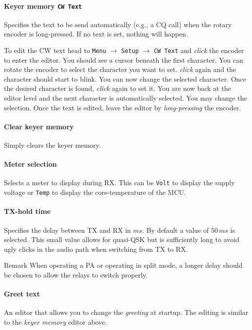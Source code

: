 \documentclass[10pt, a4paper,twoside]{scrartcl}
\newenvironment{remark}{\begin{bclogo}[couleur=blue!30,arrondi=.1,logo=\bcinfo,ombre=true]{Remark}}{\end{bclogo}}
\begin{document}
\paragraph{Keyer memory \texttt{CW Text}}
Specifies the text to be send automatically (e.g., a CQ call) when the rotary encoder is long-pressed. If no text is set, nothing will happen.

To edit the CW text head to \texttt{Menu} $\rightarrow$ \texttt{Setup} $\rightarrow$ \texttt{CW Text} and \emph{click} the encoder to enter the editor. You should see a cursor beneath the first character. You can rotate the encoder to select the character you want to set. \emph{click} again and the character should start to blink. You can now change the selected character. Once the desired character is found, \emph{click} again to set it. You are now back at the editor level and the next character is automatically selected. You may change the selection. Once the text is edited, leave the editor by \emph{long-pressing} the encoder.

\paragraph{Clear keyer memory}
Simply clears the keyer memory.

\paragraph{Meter selection}
Selects a meter to display during RX. This can be \texttt{Volt} to display the supply voltage or \texttt{Temp} to display the core-temperature of the MCU.

\paragraph{TX-hold time}
Specifies the delay between TX and RX in $ms$. By default a value of $50\,ms$ is selected. This small value allows for quasi-QSK but is sufficiently long to avoid ugly clicks in the audio path when switching from TX to RX.
\begin{remark}
When operating a PA or operating in split mode, a longer delay should be chosen to allow the relays to switch properly.
\end{remark}

\paragraph{Greet text}
An editor that allows you to change the \emph{greeting} at startup. The editing is similar to the \emph{keyer memory} editor above.
\end{document}
